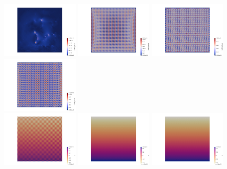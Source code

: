 \begin{center}
\includegraphics[width=3.8cm]{python_codes/fieldstone_78/results/aquarium/vel0}
\includegraphics[width=3.8cm]{python_codes/fieldstone_78/results/aquarium/vel1}
\includegraphics[width=3.8cm]{python_codes/fieldstone_78/results/aquarium/vel2}
\includegraphics[width=3.8cm]{python_codes/fieldstone_78/results/aquarium/vel3}\\
\includegraphics[width=3.8cm]{python_codes/fieldstone_78/results/aquarium/p0}
\includegraphics[width=3.8cm]{python_codes/fieldstone_78/results/aquarium/p1}
\includegraphics[width=3.8cm]{python_codes/fieldstone_78/results/aquarium/p2}

\end{center}
